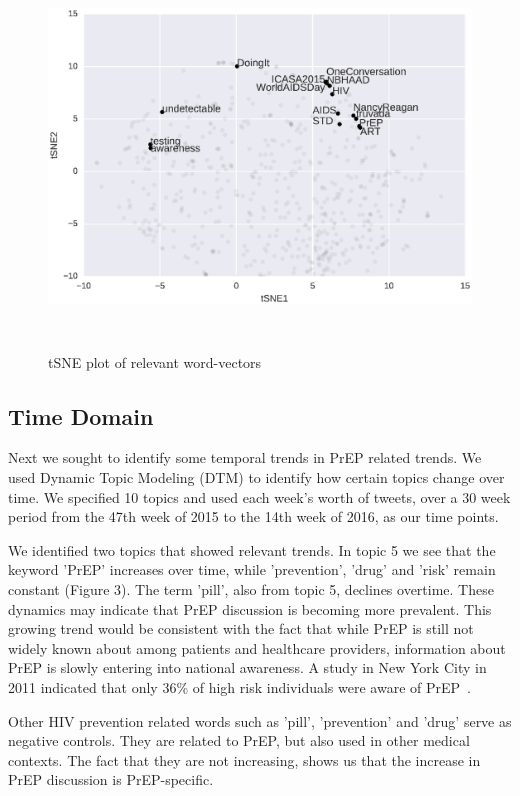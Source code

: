 \documentclass{sig-alternate-05-2015}
\begin{document}
\begin{figure}
\centering
\includegraphics[height=4in, width=6in]{tSNE_word}
\caption{tSNE plot of relevant word-vectors}
\end{figure}

\subsection{Time Domain}

Next we sought to identify some temporal trends in PrEP related trends. We used Dynamic Topic Modeling (DTM) to identify how certain topics change over time. We specified 10 topics and used each week's worth of tweets, over a 30 week period from the 47th week of 2015 to the 14th week of 2016, as our time points.

We identified two topics that showed relevant trends. In topic 5 we see that the keyword 'PrEP' increases over time, while 'prevention', 'drug' and 'risk' remain constant (Figure 3). The term 'pill', also from topic 5, declines overtime. These dynamics may indicate that PrEP discussion is becoming more prevalent. This growing trend would be consistent with the fact that while PrEP is still not widely known about among patients and healthcare providers, information about PrEP is slowly entering into national awareness. A study in New York City in 2011 indicated that only 36\% of high risk individuals were aware of PrEP~\cite{mehta2011awareness}.

Other HIV prevention related words such as 'pill', 'prevention' and 'drug' serve as negative controls. They are related to PrEP, but also used in other medical contexts. The fact that they are not increasing, shows us that the increase in PrEP discussion is PrEP-specific.
\end{document}
